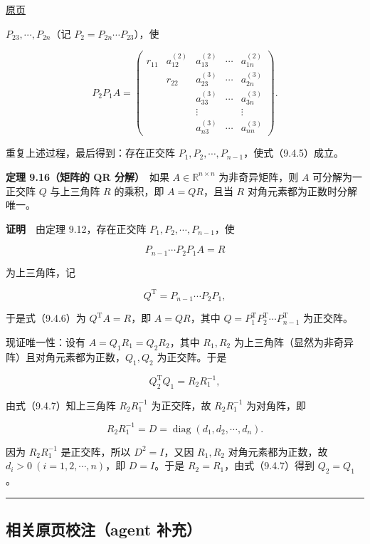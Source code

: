 \documentclass[
  10pt,
  fontset=fandol]{ctexart}
\begin{document}
\href{../../source-images/pdf-252.jpeg}{原页}

\(P_{23},\cdots,P_{2n}\)（记 \(P_2=P_{2n}\cdots P_{23}\)），使

\[
P_2P_1A=\begin{pmatrix}
r_{11}&a_{12}^{(2)}&a_{13}^{(2)}&\cdots&a_{1n}^{(2)}\\
&r_{22}&a_{23}^{(3)}&\cdots&a_{2n}^{(3)}\\
&&a_{33}^{(3)}&\cdots&a_{3n}^{(3)}\\
&&\vdots&&\vdots\\
&&a_{n3}^{(3)}&\cdots&a_{nn}^{(3)}
\end{pmatrix}.
\]

重复上述过程，最后得到：存在正交阵 \(P_1,P_2,\cdots,P_{n-1}\)，使式（9.4.5）成立。

\textbf{定理 9.16（矩阵的 QR 分解）}　如果 \(A\in\mathbb R^{n\times n}\) 为非奇异矩阵，则 \(A\) 可分解为一正交阵 \(Q\) 与上三角阵 \(R\) 的乘积，即 \(A=QR\)，且当 \(R\) 对角元素都为正数时分解唯一。

\textbf{证明}　由定理 9.12，存在正交阵 \(P_1,P_2,\cdots,P_{n-1}\)，使

\[
P_{n-1}\cdots P_2P_1A=R
\tag{9.4.6}
\]

为上三角阵，记

\[
Q^{\mathrm T}=P_{n-1}\cdots P_2P_1,
\]

于是式（9.4.6）为 \(Q^{\mathrm T}A=R\)，即 \(A=QR\)，其中 \(Q=P_1^{\mathrm T}P_2^{\mathrm T}\cdots P_{n-1}^{\mathrm T}\) 为正交阵。

现证唯一性：设有 \(A=Q_1R_1=Q_2R_2\)，其中 \(R_1,R_2\) 为上三角阵（显然为非奇异阵）且对角元素都为正数，\(Q_1,Q_2\) 为正交阵。于是

\[
Q_2^{\mathrm T}Q_1=R_2R_1^{-1},
\tag{9.4.7}
\]

由式（9.4.7）知上三角阵 \(R_2R_1^{-1}\) 为正交阵，故 \(R_2R_1^{-1}\) 为对角阵，即

\[
R_2R_1^{-1}=D=\operatorname{diag}(d_1,d_2,\cdots,d_n).
\]

因为 \(R_2R_1^{-1}\) 是正交阵，所以 \(D^2=I\)，又因 \(R_1,R_2\) 对角元素都为正数，故 \(d_i>0\ (i=1,2,\cdots,n)\)，即 \(D=I\)。于是 \(R_2=R_1\)，由式（9.4.7）得到 \(Q_2=Q_1\)。

\begin{center}\rule{0.5\linewidth}{0.5pt}\end{center}

\subsection{相关原页校注（agent 补充）}\label{ux76f8ux5173ux539fux9875ux6821ux6ce8agent-ux8865ux5145}
\end{document}
